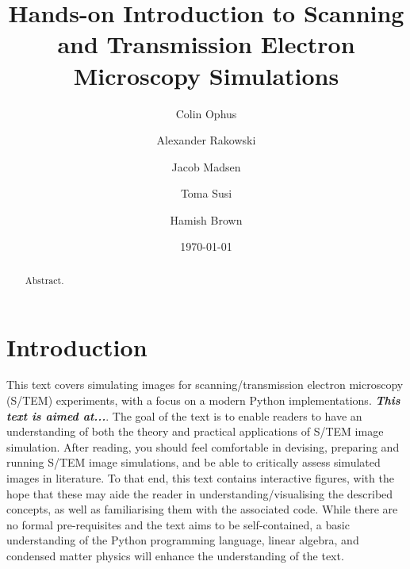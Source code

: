 \documentclass[%
 superscriptaddress,
 aip,
 amsmath,amssymb,
preprint,%
 author-year,%
longbibliography
]{revtex4-2}
\begin{document}
\title[S/TEM sim tex file]{Hands-on Introduction to Scanning and Transmission Electron Microscopy Simulations}

\author{Colin Ophus}

\author{Alexander Rakowski}

\author{Jacob Madsen}

\author{Toma Susi}

\author{Hamish Brown}


\date{\today}
\begin{abstract}

Abstract.

\end{abstract}


\maketitle
\tableofcontents

\section*{Introduction}


This text covers simulating images for scanning/transmission electron microscopy (S/TEM) experiments, with a focus on a modern Python implementations. \textbf{\emph{This text is aimed at...}}. The goal of the text is to enable readers to have an understanding of both the theory and practical applications of S/TEM image simulation. After reading, you should feel comfortable in devising, preparing and running S/TEM image simulations, and be able to critically assess simulated images in literature. To that end, this text contains interactive figures, with the hope that these may aide the reader in understanding/visualising the described concepts, as well as familiarising them with the associated code. While there are no formal pre-requisites and the text aims to be self-contained, a basic understanding of the Python programming language, linear algebra, and condensed matter physics will enhance the understanding of the text. %
\end{document}
